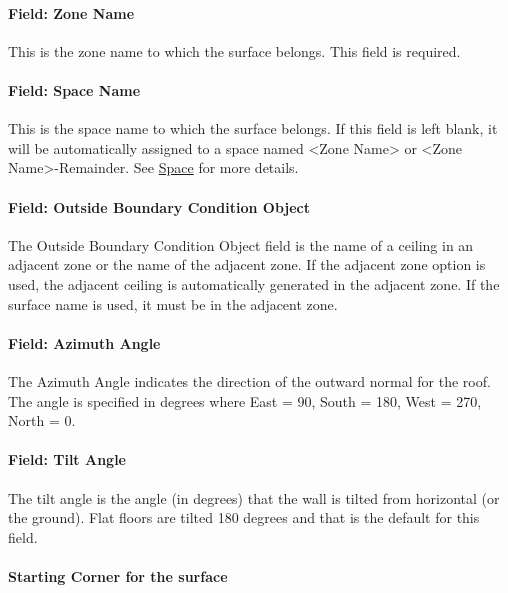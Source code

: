 \paragraph{Field: Zone Name}\label{field-zone-name-9-001}

This is the zone name to which the surface belongs. This field is required.

\paragraph{Field: Space Name}\label{field-space-name-9-001}

This is the space name to which the surface belongs. If this field is left blank, it will be automatically assigned to a space named <Zone Name> or <Zone Name>-Remainder. See \hyperref[space]{Space} for more details.

\paragraph{Field: Outside Boundary Condition Object}\label{field-outside-boundary-condition-object-2}

The Outside Boundary Condition Object field is the name of a ceiling in an adjacent zone or the name of the adjacent zone. If the adjacent zone option is used, the adjacent ceiling is automatically generated in the adjacent zone. If the surface name is used, it must be in the adjacent zone.

\paragraph{Field: Azimuth Angle}\label{field-azimuth-angle-9}

The Azimuth Angle indicates the direction of the outward normal for the roof. The angle is specified in degrees where East = 90, South = 180, West = 270, North = 0.

\paragraph{Field: Tilt Angle}\label{field-tilt-angle-9}

The tilt angle is the angle (in degrees) that the wall is tilted from horizontal (or the ground). Flat floors are tilted 180 degrees and that is the default for this field.

\paragraph{Starting Corner for the surface}\label{starting-corner-for-the-surface-9}

